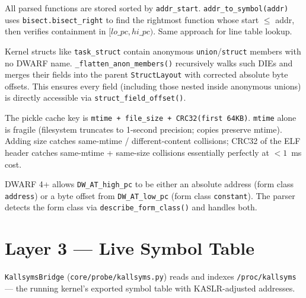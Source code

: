 \documentclass[11pt,a4paper]{article}
\newcommand{\coderef}[1]{\texttt{\small\color{layer2}#1}}
\begin{document}
\begin{description}[leftmargin=1.5em, itemsep=4pt]
  \item[\textbf{Address lookup (O(log N))}]
        All parsed functions are stored sorted by \texttt{addr\_start}.
        \texttt{addr\_to\_symbol(addr)} uses \texttt{bisect.bisect\_right} to
        find the rightmost function whose start $\leq$ addr, then verifies
        containment in $[lo\_pc, hi\_pc)$. Same approach for line table lookup.

  \item[\textbf{Anonymous union flattening (F-16)}]
        Kernel structs like \texttt{task\_struct} contain anonymous
        \texttt{union}/\texttt{struct} members with no DWARF name.
        \texttt{\_flatten\_anon\_members()} recursively walks such DIEs and
        merges their fields into the parent \coderef{StructLayout} with
        corrected absolute byte offsets. This ensures every field (including
        those nested inside anonymous unions) is directly accessible via
        \texttt{struct\_field\_offset()}.

  \item[\textbf{Cache key (F-14)}]
        The pickle cache key is \texttt{mtime + file\_size + CRC32(first 64KB)}.
        \texttt{mtime} alone is fragile (filesystem truncates to 1-second
        precision; copies preserve mtime). Adding size catches same-mtime /
        different-content collisions; CRC32 of the ELF header catches
        same-mtime + same-size collisions essentially perfectly at $<1$~ms cost.

  \item[\textbf{DW\_AT\_high\_pc duality}]
        DWARF 4+ allows \texttt{DW\_AT\_high\_pc} to be either an absolute
        address (form class \texttt{address}) or a byte offset from
        \texttt{DW\_AT\_low\_pc} (form class \texttt{constant}). The parser
        detects the form class via \texttt{describe\_form\_class()} and handles
        both.
\end{description}

\section{Layer 3 --- Live Symbol Table}
\label{sec:kallsyms}

\coderef{KallsymsBridge} (\texttt{core/probe/kallsyms.py}) reads and indexes
\texttt{/proc/kallsyms} --- the running kernel's exported symbol table with
KASLR-adjusted addresses.
\end{document}

